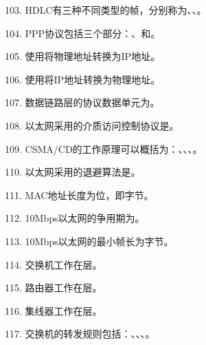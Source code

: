 103. HDLC有三种不同类型的帧，分别称为\underline{\hspace{2cm}}、\underline{\hspace{2cm}}、\underline{\hspace{2cm}}。

104. PPP协议包括三个部分：\underline{\hspace{2cm}}、\underline{\hspace{2cm}}和\underline{\hspace{2cm}}。

105. 使用\underline{\hspace{2cm}}将物理地址转换为IP地址。

106. 使用\underline{\hspace{2cm}}将IP地址转换为物理地址。

107. 数据链路层的协议数据单元为\underline{\hspace{2cm}}。

108. 以太网采用的介质访问控制协议是\underline{\hspace{2cm}}。

109. CSMA/CD的工作原理可以概括为：\underline{\hspace{2cm}}、\underline{\hspace{2cm}}、\underline{\hspace{2cm}}、\underline{\hspace{2cm}}。

110. 以太网采用的退避算法是\underline{\hspace{4cm}}。

111. MAC地址长度为\underline{\hspace{2cm}}位，即\underline{\hspace{2cm}}字节。

112. 10Mbps以太网的争用期为\underline{\hspace{2cm}}。

113. 10Mbps以太网的最小帧长为\underline{\hspace{2cm}}字节。

114. 交换机工作在\underline{\hspace{2cm}}层。

115. 路由器工作在\underline{\hspace{2cm}}层。

116. 集线器工作在\underline{\hspace{2cm}}层。

117. 交换机的转发规则包括：\underline{\hspace{2cm}}、\underline{\hspace{2cm}}、\underline{\hspace{2cm}}、\underline{\hspace{2cm}}。


